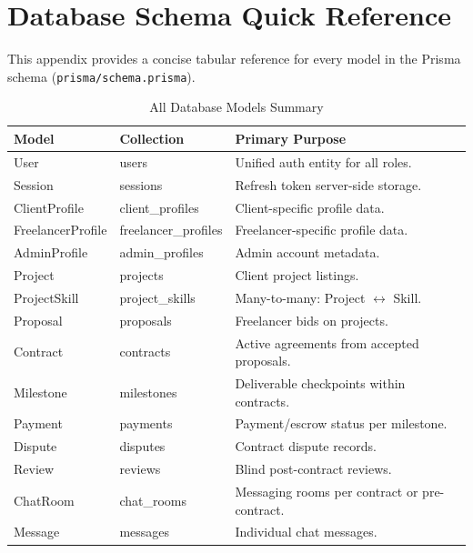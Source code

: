 \chapter{Database Schema Quick Reference}
\label{app:schema}

This appendix provides a concise tabular reference for every model in the \projectname{} Prisma schema (\texttt{prisma/schema.prisma}).

\begin{table}[H]
\centering
\caption{All Database Models Summary}
\begin{tabularx}{\textwidth}{llX}
\toprule
\textbf{Model} & \textbf{Collection} & \textbf{Primary Purpose} \\
\midrule
User              & users               & Unified auth entity for all roles. \\
Session           & sessions            & Refresh token server-side storage. \\
ClientProfile     & client\_profiles    & Client-specific profile data. \\
FreelancerProfile & freelancer\_profiles & Freelancer-specific profile data. \\
AdminProfile      & admin\_profiles     & Admin account metadata. \\
Project           & projects            & Client project listings. \\
ProjectSkill      & project\_skills     & Many-to-many: Project $\leftrightarrow$ Skill. \\
Proposal          & proposals           & Freelancer bids on projects. \\
Contract          & contracts           & Active agreements from accepted proposals. \\
Milestone         & milestones          & Deliverable checkpoints within contracts. \\
Payment           & payments            & Payment/escrow status per milestone. \\
Dispute           & disputes            & Contract dispute records. \\
Review            & reviews             & Blind post-contract reviews. \\
ChatRoom          & chat\_rooms         & Messaging rooms per contract or pre-contract. \\
Message           & messages            & Individual chat messages. \\

\end{tabularx}
\end{table}
